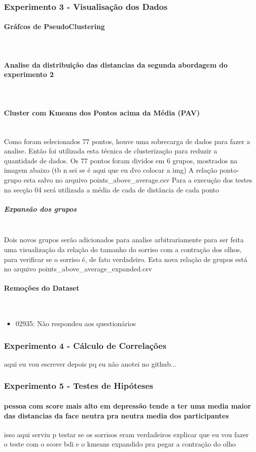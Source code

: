\subsubsection{Experimento 3 - Visualisação dos Dados}
\paragraph{Gráfcos de PseudoClustering}\mbox{}\\
\paragraph{Analise da distribuição das distancias da segunda abordagem do experimento 2}\mbox{}\\
\paragraph{Cluster com Kmeans dos Pontos acima da Média (PAV)}\mbox{}\\
Como foram selecionados 77 pontos, houve uma sobrecarga de dados para fazer a analise. Então foi utilizada esta técnica de clusterização para reduzir a quantidade de dados. Os 77 pontos foram dividos em 6 grupos, mostrados na imagem abaixo
(tb n sei se é aqui que eu dvo colocar a img)
A relação ponto-grupo esta salvo no arquivo points\_above\_average.csv Para a execução dos testes na secção 04 será utilizada a média de cada de distância de cada ponto

\subparagraph{Expansão dos grupos}\mbox{}\\
Dois novos grupos serão adicionados para analise arbitrariamente para ser feita uma visualização da relação do tamanho do sorriso com a contração dos olhos, para verificar se o sorriso é, de fato verdadeiro. Esta nova relação de grupos está no arquivo points\_above\_average\_expanded.csv

\paragraph{Remoções do Dataset}\mbox{}\\
\begin{itemize}
    \item {02935: Não respondeu aos questionários}
\end{itemize}

\subsubsection{Experimento 4 - Cálculo de Correlações}
aqui eu vou escrever depois pq eu não anotei no github...
\subsubsection{Experimento 5 - Testes de Hipóteses}
\paragraph{pessoa com score mais alto em depressão tende a ter uma media maior das distancias da face neutra pra neutra media dos participantes}
isso aqui serviu p testar se os sorrisos eram verdadeiros
explicar que eu vou fazer o teste com o score bdi e o kmeans expandido pra pegar a contração do olho
